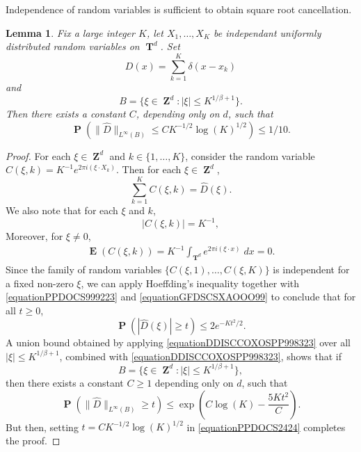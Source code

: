 \documentclass[12pt,reqno]{article}
\numberwithin{equation}{section}
\DeclareMathOperator{\ZZ}{\mathbf{Z}}
\DeclareMathOperator{\TT}{\mathbf{T}}
\newtheorem{lemma}{Lemma}
\DeclareMathOperator{\EE}{\mathbf{E}}
\DeclareMathOperator{\PP}{\mathbf{P}}
\begin{document}
Independence of random variables is sufficient to obtain square root cancellation.

\begin{lemma} \label{LemmaGISCICS1}
    Fix a large integer $K$, let $X_1, \dots, X_K$ be independant uniformly distributed random variables on $\TT^d$. Set
    \[ D(x) = \sum_{k = 1}^K \delta(x - x_k) \]
    and
    \[ B = \{ \xi \in \ZZ^d: |\xi| \leq K^{1/\beta + 1} \}. \]
    Then there exists a constant $C$, depending only on $d$, such that
    \[ \PP \left( \| \widehat{D} \|_{L^\infty(B)} \leq C K^{-1/2} \log(K)^{1/2} \right) \leq 1/10. \]
\end{lemma}
\begin{proof}
    For each $\xi \in \ZZ^d$ and $k \in \{ 1, \dots, K \}$, consider the random variable $C(\xi,k) = K^{-1} e^{2 \pi i (\xi \cdot X_k)}$. Then for each $\xi \in \ZZ^d$,
    \begin{equation} \label{equationPPDOCS999223}
        \sum_{k = 1}^K C(\xi,k) = \widehat{D}(\xi).
    \end{equation}
    We also note that for each $\xi$ and $k$,
    \begin{equation} \label{equationGFDSCSXAOOO99}
        |C(\xi,k)| = K^{-1},
    \end{equation}
    Moreover, for $\xi \neq 0$,
    \begin{align*}
        \EE(C(\xi,k)) = K^{-1} \int_{\TT^d} e^{2 \pi i (\xi \cdot x)}\; dx = 0.
    \end{align*}
    Since the family of random variables $\{ C(\xi,1), \dots, C(\xi,K) \}$ is independent for a fixed non-zero $\xi$, we can apply Hoeffding's inequality together with \eqref{equationPPDOCS999223} and \eqref{equationGFDSCSXAOOO99} to conclude that for all $t \geq 0$,
    \begin{equation} \label{equationDDISCCOXOSPP998323}
        \PP \left( |\widehat{D}(\xi)| \geq t \right) \leq 2 e^{-Kt^2/2}.
    \end{equation}
    A union bound obtained by applying \eqref{equationDDISCCOXOSPP998323} over all $|\xi| \leq K^{1/\beta+1}$, combined with \eqref{equationDDISCCOXOSPP998323}, shows that if
    \[ B = \{ \xi \in \ZZ^d : |\xi| \leq K^{1/\beta + 1} \}, \]
    then there exists a constant $C \geq 1$ depending only on $d$, such that
    \begin{equation} \label{equationPPDOCS2424}
        \PP \left( \| \widehat{D} \|_{L^\infty(B)} \geq t \right) \leq \exp \left( C \log(K) - \frac{5K t^2}{C} \right).
    \end{equation}
    But then, setting $t = CK^{-1/2} \log(K)^{1/2}$ in \eqref{equationPPDOCS2424} completes the proof.
\end{proof}
\end{document}
